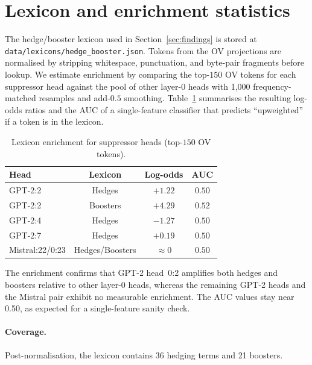 \appendix

\section{Lexicon and enrichment statistics}
\label{app:lexicon}

The hedge/booster lexicon used in Section~\ref{sec:findings} is stored at \texttt{data/lexicons/hedge\_booster.json}.
Tokens from the OV projections are normalised by stripping whitespace, punctuation, and byte-pair fragments before lookup.
We estimate enrichment by comparing the top-$150$ OV tokens for each suppressor head against the pool of other layer-0 heads with 1{,}000 frequency-matched resamples and add-$0.5$ smoothing.
Table~\ref{tab:lexicon-logodds} summarises the resulting log-odds ratios and the AUC of a single-feature classifier that predicts ``upweighted'' if a token is in the lexicon.

\begin{table}[h]
    \centering
    \caption{Lexicon enrichment for suppressor heads (top-$150$ OV tokens).}
    \label{tab:lexicon-logodds}
    \begin{tabular}{lccc}
        \toprule
        Head & Lexicon & Log-odds & AUC \\
        \midrule
        GPT-2\;0:2 & Hedges & $+1.22$ & $0.50$ \\
        GPT-2\;0:2 & Boosters & $+4.29$ & $0.52$ \\
        GPT-2\;0:4 & Hedges & $-1.27$ & $0.50$ \\
        GPT-2\;0:7 & Hedges & $+0.19$ & $0.50$ \\
        Mistral\;0:22/0:23 & Hedges/Boosters & $\approx 0$ & $0.50$ \\
        \bottomrule
    \end{tabular}
\end{table}

The enrichment confirms that GPT-2 head~0:2 amplifies both hedges and boosters relative to other layer-0 heads, whereas the remaining GPT-2 heads and the Mistral pair exhibit no measurable enrichment. The AUC values stay near 0.50, as expected for a single-feature sanity check.

\paragraph{Coverage.} Post-normalisation, the lexicon contains 36 hedging terms and 21 boosters.



